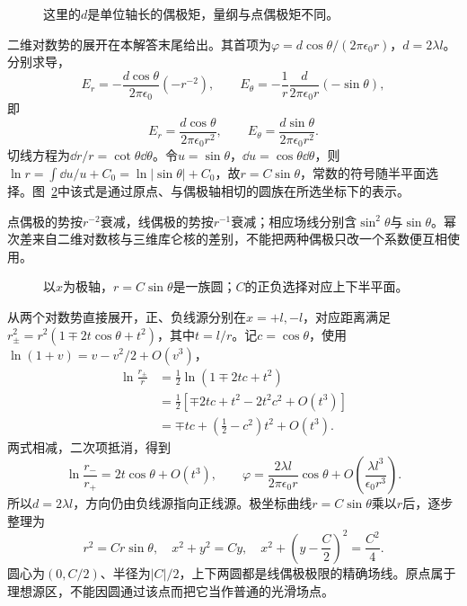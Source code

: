 \begin{figure}[H]\centering
{}
\caption{这里的$d$是单位轴长的偶极矩，量纲与点偶极矩不同。}\label{fig:es1-h12-q}
\end{figure}
\begin{solution}
二维对数势的展开在本解答末尾给出。其首项为$\varphi=d\cos\theta/(2\pi\epsilon_0r)$，$d=2\lambda l$。分别求导，
\[E_r=-\frac{d\cos\theta}{2\pi\epsilon_0}(-r^{-2}),\qquad
E_\theta=-\frac1r\frac{d}{2\pi\epsilon_0r}(-\sin\theta),\]
即
\[E_r=\frac{d\cos\theta}{2\pi\epsilon_0r^2},\qquad
E_\theta=\frac{d\sin\theta}{2\pi\epsilon_0r^2}.\]
切线方程为$\dd r/r=\cot\theta\dd\theta$。令$u=\sin\theta$，$\dd u=\cos\theta\dd\theta$，则$\ln r=\int\dd u/u+C_0=\ln|\sin\theta|+C_0$，故$\boxed{r=C\sin\theta}$，常数的符号随半平面选择。图~\ref{fig:es1-h12-s}中该式是通过原点、与偶极轴相切的圆族在所选坐标下的表示。

点偶极的势按$r^{-2}$衰减，线偶极的势按$r^{-1}$衰减；相应场线分别含$\sin^2\theta$与$\sin\theta$。幂次差来自二维对数核与三维库仑核的差别，不能把两种偶极只改一个系数便互相使用。
\begin{figure}[H]\centering
{}
\caption{以$x$为极轴，$r=C\sin\theta$是一族圆；$C$的正负选择对应上下半平面。}\label{fig:es1-h12-s}
\end{figure}


从两个对数势直接展开，正、负线源分别在$x=+l,-l$，对应距离满足$r_\pm^2=r^2(1\mp2t\cos\theta+t^2)$，其中$t=l/r$。记$c=\cos\theta$，使用$\ln(1+v)=v-v^2/2+O(v^3)$，
\[\begin{aligned}
\ln\frac{r_\pm}r
&=\frac12\ln(1\mp2tc+t^2)\\
&=\frac12\left[\mp2tc+t^2-2t^2c^2+O(t^3)\right]\\
&=\mp tc+\left(\frac12-c^2\right)t^2+O(t^3).
\end{aligned}\]
两式相减，二次项抵消，得到
\[\ln\frac{r_-}{r_+}=2t\cos\theta+O(t^3),\qquad
\varphi=\frac{2\lambda l}{2\pi\epsilon_0r}\cos\theta
+O\left(\frac{\lambda l^3}{\epsilon_0r^3}\right).
\]
所以$d=2\lambda l$，方向仍由负线源指向正线源。极坐标曲线$r=C\sin\theta$乘以$r$后，逐步整理为
\[r^2=Cr\sin\theta,\quad x^2+y^2=Cy,
\quad x^2+\left(y-\frac C2\right)^2=\frac{C^2}{4}.
\]
圆心为$(0,C/2)$、半径为$|C|/2$，上下两圆都是线偶极极限的精确场线。原点属于理想源区，不能因圆通过该点而把它当作普通的光滑场点。\end{solution}

